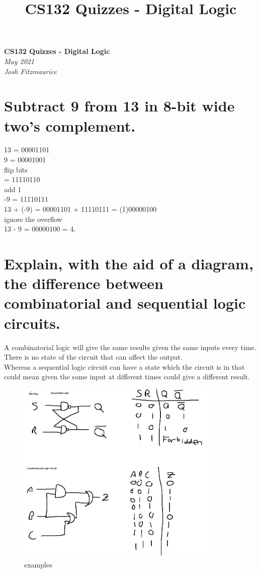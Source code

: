 \documentclass{article}
\title{CS132 Quizzes - Digital Logic}
\begin{document}
\begin{center}
    \Huge\textbf{CS132 Quizzes - Digital Logic}\\
    \huge\textit{May 2021}\\
    \medskip
    \Large\textit{Josh Fitzmaurice}
\end{center}


\section{Subtract 9 from 13 in 8-bit wide two’s complement.}
13 = 00001101\\
9 = 00001001\\
flip bits\\
  = 11110110\\
add 1\\
-9 = 11110111\\
13 + (-9) = 00001101 + 11110111 = (1)00000100\\
ignore the overflow\\
13 - 9 = 00000100 = 4.

\section{Explain, with the aid of a diagram, the difference between combinatorial and sequential logic circuits.}
A combinatorial logic will give the same results given the same inputs every
time. There is no state of the circuit that can affect the output.\\
Whereas a sequential logic circuit can have a state which the circuit is in that
could mean given the same input at different times could give a different
result.\\

\begin{figure}[h]
    \centering
    \includegraphics[width=100mm]{digitalLogic.PNG}
    \caption{examples}
    \label{fig:my_label}
\end{figure}
\end{document}

